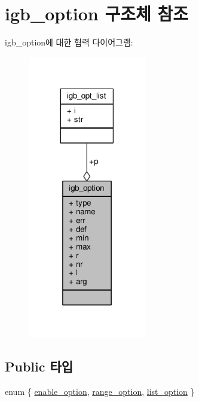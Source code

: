 \hypertarget{structigb__option}{}\section{igb\+\_\+option 구조체 참조}
\label{structigb__option}


igb\+\_\+option에 대한 협력 다이어그램\+:
\nopagebreak
\begin{figure}[H]
\begin{center}
\leavevmode
\includegraphics[width=146pt]{structigb__option__coll__graph}
\end{center}
\end{figure}
\subsection*{Public 타입}
\begin{DoxyCompactItemize}
\item 
enum \{ \hyperlink{structigb__option_a7859c0a3efa8b1c360f5c2376baf051ea6980b949857029d200f7f849e79aeb33}{enable\+\_\+option}, 
\hyperlink{structigb__option_a7859c0a3efa8b1c360f5c2376baf051ea5f93dbadadc39bdfe53b374cbd258e55}{range\+\_\+option}, 
\hyperlink{structigb__option_a7859c0a3efa8b1c360f5c2376baf051eaa9c30ef7f87bd754f84faec54382071b}{list\+\_\+option}
 \}
\end{DoxyCompactItemize}
